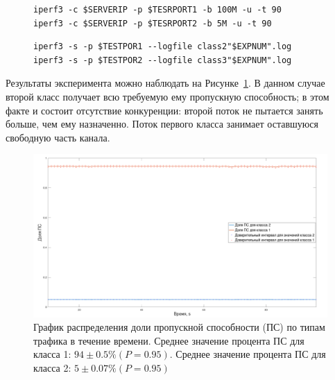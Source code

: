         \begin{figure}[ht!]
    		\center
    		\begin{lstlisting}[frame=lines,
    						  caption={Команда iperf на узле-источнике (клиентская сторона).},
    						  label={lst:iperfsrc2}]
iperf3 -c $SERVERIP -p $TESRPORT1 -b 100M -u -t 90
iperf3 -c $SERVERIP -p $TESRPORT2 -b 5M -u -t 90
    		\end{lstlisting}
        \end{figure}	
        \begin{figure}[ht!]
    		\center
    		\begin{lstlisting}[frame=lines,
    						  caption={Команда iperf на узле-цели (серверная сторона).},
    						  label={lst:iperfdst2}]
iperf3 -s -p $TESTPOR1 --logfile class2"$EXPNUM".log
iperf3 -s -p $TESTPOR2 --logfile class3"$EXPNUM".log
    		\end{lstlisting}
        \end{figure}

			Результаты эксперимента можно наблюдать на Рисунке~\ref{pic:plot2}. В данном
			случае второй класс получает всю требуемую ему пропускную способность; в этом
			факте и состоит отсутствие конкуренции: второй поток не пытается занять больше,
			чем ему назначенно. Поток первого класса занимает оставшуюся свободную часть канала.
			
            \begin{figure}[ht!]
            	\center
            	\includegraphics[width=\linewidth]{./plotnc.png} %
            	\caption{График распределения доли пропускной способности (ПС) по типам трафика в течение времени.
						 Среднее значение процента  ПС для класса 1: $94 \pm 0.5 \%(P = 0.95)$.
                         Среднее значение процента  ПС для класса 2: $5 \pm 0.07 \%(P = 0.95)$}
    			\label{pic:plot2}
            \end{figure}
